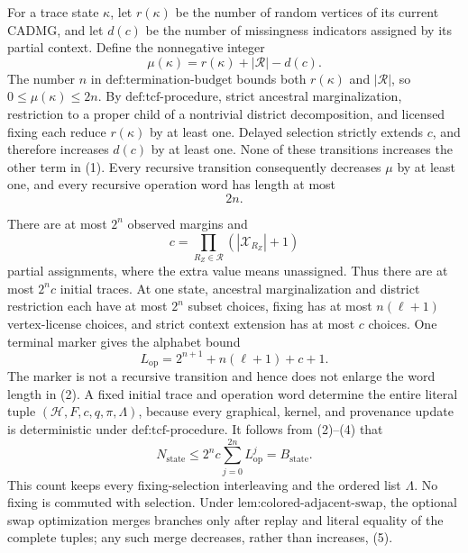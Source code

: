 For a trace state \(\kappa\), let \(r(\kappa)\) be the number of random vertices of its current CADMG, and let \(d(c)\) be the number of missingness indicators assigned by its partial context. Define the nonnegative integer
\[
\mu(\kappa)=r(\kappa)+|\mathcal R|-d(c).
\tag{1}
\]
The number \(n\) in \(\text{def:termination-budget}\) bounds both \(r(\kappa)\) and \(|\mathcal R|\), so \(0\leq\mu(\kappa)\leq2n\). By \(\text{def:tcf-procedure}\), strict ancestral marginalization, restriction to a proper child of a nontrivial district decomposition, and licensed fixing each reduce \(r(\kappa)\) by at least one. Delayed selection strictly extends \(c\), and therefore increases \(d(c)\) by at least one. None of these transitions increases the other term in (1). Every recursive transition consequently decreases \(\mu\) by at least one, and every recursive operation word has length at most
\[
2n.
\tag{2}
\]

There are at most \(2^n\) observed margins and
\[
c=\prod_{R_Z\in\mathcal R}(|\mathcal X_{R_Z}|+1)
\tag{3}
\]
partial assignments, where the extra value means unassigned. Thus there are at most \(2^n c\) initial traces. At one state, ancestral marginalization and district restriction each have at most \(2^n\) subset choices, fixing has at most \(n(\ell+1)\) vertex-license choices, and strict context extension has at most \(c\) choices. One terminal marker gives the alphabet bound
\[
L_{\mathrm{op}}=2^{n+1}+n(\ell+1)+c+1.
\tag{4}
\]
The marker is not a recursive transition and hence does not enlarge the word length in (2). A fixed initial trace and operation word determine the entire literal tuple \((\mathcal H,F,c,q,\pi,\Lambda)\), because every graphical, kernel, and provenance update is deterministic under \(\text{def:tcf-procedure}\). It follows from (2)--(4) that
\[
N_{\mathrm{state}}
\leq2^n c\sum_{j=0}^{2n}L_{\mathrm{op}}^j
=B_{\mathrm{state}}.
\tag{5}
\]
This count keeps every fixing-selection interleaving and the ordered list \(\Lambda\). No fixing is commuted with selection. Under \(\text{lem:colored-adjacent-swap}\), the optional swap optimization merges branches only after replay and literal equality of the complete tuples; any such merge decreases, rather than increases, (5).

